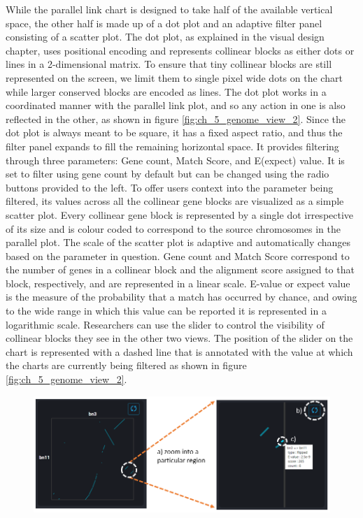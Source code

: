 While the parallel link chart is designed to take half of the available vertical space, the other half is made up of a dot plot and an adaptive filter panel consisting of a scatter plot. The dot plot, as explained in the visual design chapter, uses positional encoding and represents collinear blocks as either dots or lines in a 2-dimensional matrix. To ensure that tiny collinear blocks are still represented on the screen, we limit them to single pixel wide dots on the chart while larger conserved blocks are encoded as lines. The dot plot works in a coordinated manner with the parallel link plot, and so any action in one is also reflected in the other, as shown in figure \ref{fig:ch_5_genome_view_2}. Since the dot plot is always meant to be square, it has a fixed aspect ratio, and thus the filter panel expands to fill the remaining horizontal space. It provides filtering through three parameters: Gene count, Match Score, and E(expect) value. It is set to filter using gene count by default but can be changed using the radio buttons provided to the left. To offer users context into the parameter being filtered, its values across all the collinear gene blocks are visualized as a simple scatter plot. Every collinear gene block is represented by a single dot irrespective of its size and is colour coded to correspond to the source chromosomes in the parallel plot. The scale of the scatter plot is adaptive and automatically changes based on the parameter in question. Gene count and Match Score correspond to the number of genes in a collinear block and the alignment score assigned to that block, respectively, and are represented in a linear scale. E-value or expect value is the measure of the probability that a match has occurred by chance, and owing to the wide range in which this value can be reported it is represented in a logarithmic scale. Researchers can use the slider to control the visibility of collinear blocks they see in the other two views. The position of the slider on the chart is represented with a dashed line that is annotated with the value at which the charts are currently being filtered as shown in figure \ref{fig:ch_5_genome_view_2}.


\begin{figure}[h]
  \centering
  \includegraphics[width=.75\linewidth]{images/ch_5_chromosome_view.PNG}
  \label{fig:ch_5_chromosome_view}
\end{figure} 

